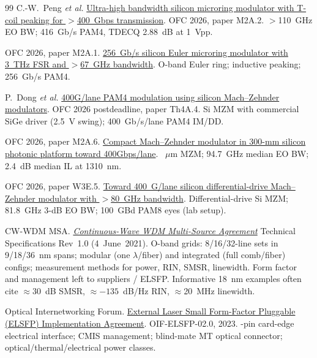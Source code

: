 \begin{thebibliography}{99}
C.-W.~Peng \emph{et al.}
\newblock \href{https://doi.org/10.1364/OFC.2026.M2A.2}{Ultra-high bandwidth silicon microring modulator with T-coil peaking for $>$400~Gbps transmission}.
\newblock OFC 2026, paper M2A.2.
\newblock $>$110~GHz EO BW; 416~Gb/s PAM4, TDECQ 2.88~dB at 1~Vpp.

OFC 2026, paper M2A.1.
\newblock \href{https://doi.org/10.1364/OFC.2026.M2A.1}{256~Gb/s silicon Euler microring modulator with 3~THz FSR and $>$67~GHz bandwidth}.
\newblock O-band Euler ring; inductive peaking; 256~Gb/s PAM4.

P.~Dong \emph{et al.}
\newblock \href{https://doi.org/10.1364/OFC.2026.Th4A.4}{400G/lane PAM4 modulation using silicon Mach--Zehnder modulators}.
\newblock OFC 2026 postdeadline, paper Th4A.4.
\newblock Si MZM with commercial SiGe driver (2.5~V swing); 400~Gb/s/lane PAM4 IM/DD.

OFC 2026, paper M2A.6.
\newblock \href{https://doi.org/10.1364/OFC.2026.M2A.6}{Compact Mach--Zehnder modulator in 300-mm silicon photonic platform toward 400Gbps/lane}.
~$\mu$m MZM; 94.7~GHz median EO BW; 2.4~dB median IL at 1310~nm.

OFC 2026, paper W3E.5.
\newblock \href{https://doi.org/10.1364/OFC.2026.W3E.5}{Toward 400~G/lane silicon differential-drive Mach--Zehnder modulator with $>$80~GHz bandwidth}.
\newblock Differential-drive Si MZM; 81.8~GHz 3-dB EO BW; 100~GBd PAM8 eyes (lab setup).

CW-WDM MSA.
\newblock \emph{\href{https://cw-wdm.org/}{Continuous-Wave WDM Multi-Source Agreement}}
Technical Specifications Rev~1.0 (4~June~2021).
\newblock O-band grids: 8/16/32-line sets in 9/18/36~nm spans; modular (one
$\lambda$/fiber) and integrated (full comb/fiber) configs; measurement methods for
power, RIN, SMSR, linewidth. Form factor and management left to suppliers /
ELSFP. Informative 18~nm examples often cite $\approx$30~dB SMSR,
$\approx-135$~dB/Hz RIN, $\approx$20~MHz linewidth.

Optical Internetworking Forum.
\newblock \href{https://www.oiforum.com/wp-content/uploads/OIF-ELSFP-02.0.pdf}{External Laser Small Form-Factor Pluggable (ELSFP) Implementation Agreement}.
\newblock OIF-ELSFP-02.0, 2023.
-pin card-edge electrical interface; CMIS management; blind-mate MT optical connector; optical/thermal/electrical power classes.


\end{thebibliography}
